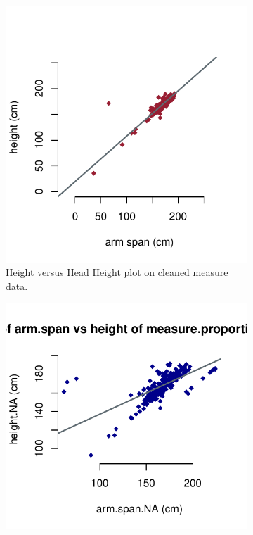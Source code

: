 \documentclass[]{article}
\begin{document}
\begin{figure}[!ht]
    \begin{subfigure}[h]{0.5\textwidth}
    \centering
            \includegraphics[trim = 0 0 5cm 0,clip,scale=2]{pdfs/OneGraphic.pdf}
        \caption{ Height versus Head Height plot on cleaned measure data.}
        \label{fig:sub-first}
    \end{subfigure}
    \begin{subfigure}[h]{0.5\textwidth}
    \centering
        \includegraphics[trim = 5cm 0 0 0,clip,scale=2]{pdfs/InstructorDataOneGraphicPlot.pdf}

\end{subfigure}
\end{figure}
\end{document}
